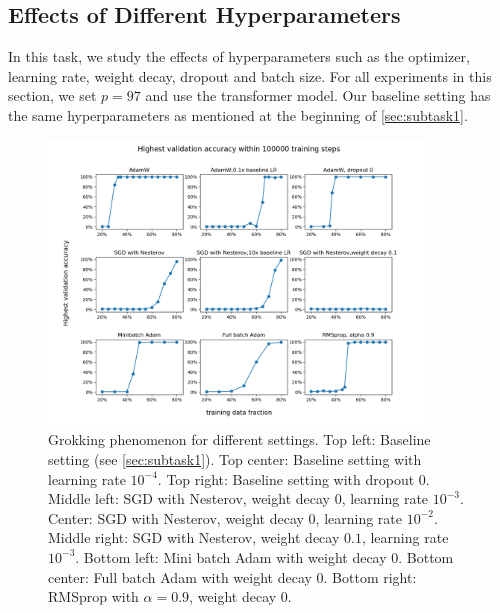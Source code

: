 \subsection{Effects of Different Hyperparameters}
\label{sec:subtask3}

In this task, we study the effects of hyperparameters such as the optimizer, learning rate, weight decay, dropout and batch size.
For all experiments in this section, we set $p = 97$ and use the transformer model.
Our baseline setting has the same hyperparameters as mentioned at the beginning of \cref{sec:subtask1}.

\begin{figure}[!ht]
    \centering
    \includegraphics[width=0.9\textwidth]{fig/different_settings/different_settings.png}
    \caption{Grokking phenomenon for different settings.
    Top left: Baseline setting (see \cref{sec:subtask1}).
    Top center: Baseline setting with learning rate $10^{-4}$.
    Top right: Baseline setting with dropout $0$.
    Middle left: SGD with Nesterov, weight decay $0$, learning rate $10^{-3}$.
    Center: SGD with Nesterov, weight decay $0$, learning rate $10^{-2}$.
    Middle right: SGD with Nesterov, weight decay $0.1$, learning rate $10^{-3}$.
    Bottom left: Mini batch Adam with weight decay $0$.
    Bottom center: Full batch Adam with weight decay $0$.
    Bottom right: RMSprop with $\alpha = 0.9$, weight decay $0$.
    }
    \label{fig:different_settings}
\end{figure}
